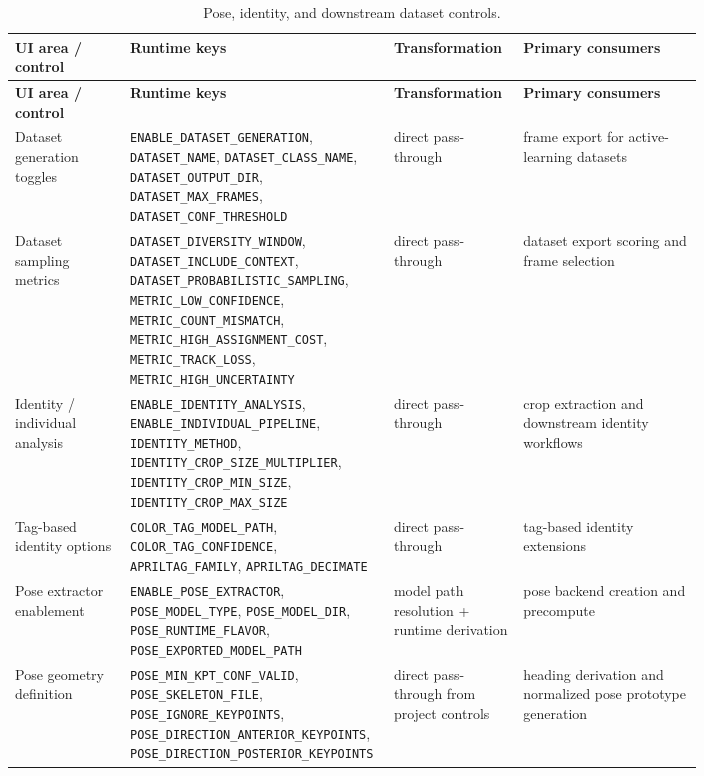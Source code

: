 \documentclass[11pt]{article}
\newcommand{\runtimekey}[1]{\texttt{#1}}
\begin{document}
\begin{longtable}{L{0.16\linewidth} L{0.21\linewidth} L{0.18\linewidth} L{0.25\linewidth}}
\caption{Pose, identity, and downstream dataset controls.}\label{tab:ui-pose}\\
\toprule
\textbf{UI area / control} & \textbf{Runtime keys} & \textbf{Transformation} & \textbf{Primary consumers} \\
\midrule
\endfirsthead
\toprule
\textbf{UI area / control} & \textbf{Runtime keys} & \textbf{Transformation} & \textbf{Primary consumers} \\
\midrule
\endhead
Dataset generation toggles & \runtimekey{ENABLE\_DATASET\_GENERATION}, \runtimekey{DATASET\_NAME}, \runtimekey{DATASET\_CLASS\_NAME}, \runtimekey{DATASET\_OUTPUT\_DIR}, \runtimekey{DATASET\_MAX\_FRAMES}, \runtimekey{DATASET\_CONF\_THRESHOLD} & direct pass-through & frame export for active-learning datasets \\
Dataset sampling metrics & \runtimekey{DATASET\_DIVERSITY\_WINDOW}, \runtimekey{DATASET\_INCLUDE\_CONTEXT}, \runtimekey{DATASET\_PROBABILISTIC\_SAMPLING}, \runtimekey{METRIC\_LOW\_CONFIDENCE}, \runtimekey{METRIC\_COUNT\_MISMATCH}, \runtimekey{METRIC\_HIGH\_ASSIGNMENT\_COST}, \runtimekey{METRIC\_TRACK\_LOSS}, \runtimekey{METRIC\_HIGH\_UNCERTAINTY} & direct pass-through & dataset export scoring and frame selection \\
Identity / individual analysis & \runtimekey{ENABLE\_IDENTITY\_ANALYSIS}, \runtimekey{ENABLE\_INDIVIDUAL\_PIPELINE}, \runtimekey{IDENTITY\_METHOD}, \runtimekey{IDENTITY\_CROP\_SIZE\_MULTIPLIER}, \runtimekey{IDENTITY\_CROP\_MIN\_SIZE}, \runtimekey{IDENTITY\_CROP\_MAX\_SIZE} & direct pass-through & crop extraction and downstream identity workflows \\
Tag-based identity options & \runtimekey{COLOR\_TAG\_MODEL\_PATH}, \runtimekey{COLOR\_TAG\_CONFIDENCE}, \runtimekey{APRILTAG\_FAMILY}, \runtimekey{APRILTAG\_DECIMATE} & direct pass-through & tag-based identity extensions \\
Pose extractor enablement & \runtimekey{ENABLE\_POSE\_EXTRACTOR}, \runtimekey{POSE\_MODEL\_TYPE}, \runtimekey{POSE\_MODEL\_DIR}, \runtimekey{POSE\_RUNTIME\_FLAVOR}, \runtimekey{POSE\_EXPORTED\_MODEL\_PATH} & model path resolution + runtime derivation & pose backend creation and precompute \\
Pose geometry definition & \runtimekey{POSE\_MIN\_KPT\_CONF\_VALID}, \runtimekey{POSE\_SKELETON\_FILE}, \runtimekey{POSE\_IGNORE\_KEYPOINTS}, \runtimekey{POSE\_DIRECTION\_ANTERIOR\_KEYPOINTS}, \runtimekey{POSE\_DIRECTION\_POSTERIOR\_KEYPOINTS} & direct pass-through from project controls & heading derivation and normalized pose prototype generation \\

\end{longtable}
\end{document}
